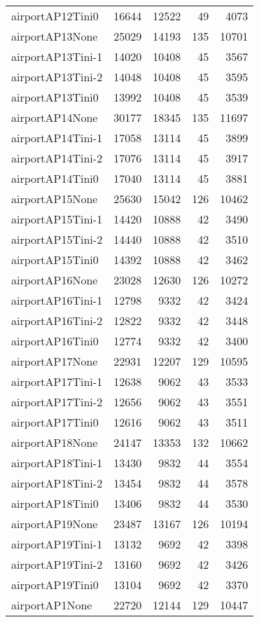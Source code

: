 \begin{longtable}{lrrrr}
airportAP12Tini0 & 16644 & 12522 & 49 & 4073 \\
airportAP13None & 25029 & 14193 & 135 & 10701 \\
airportAP13Tini-1 & 14020 & 10408 & 45 & 3567 \\
airportAP13Tini-2 & 14048 & 10408 & 45 & 3595 \\
airportAP13Tini0 & 13992 & 10408 & 45 & 3539 \\
airportAP14None & 30177 & 18345 & 135 & 11697 \\
airportAP14Tini-1 & 17058 & 13114 & 45 & 3899 \\
airportAP14Tini-2 & 17076 & 13114 & 45 & 3917 \\
airportAP14Tini0 & 17040 & 13114 & 45 & 3881 \\
airportAP15None & 25630 & 15042 & 126 & 10462 \\
airportAP15Tini-1 & 14420 & 10888 & 42 & 3490 \\
airportAP15Tini-2 & 14440 & 10888 & 42 & 3510 \\
airportAP15Tini0 & 14392 & 10888 & 42 & 3462 \\
airportAP16None & 23028 & 12630 & 126 & 10272 \\
airportAP16Tini-1 & 12798 & 9332 & 42 & 3424 \\
airportAP16Tini-2 & 12822 & 9332 & 42 & 3448 \\
airportAP16Tini0 & 12774 & 9332 & 42 & 3400 \\
airportAP17None & 22931 & 12207 & 129 & 10595 \\
airportAP17Tini-1 & 12638 & 9062 & 43 & 3533 \\
airportAP17Tini-2 & 12656 & 9062 & 43 & 3551 \\
airportAP17Tini0 & 12616 & 9062 & 43 & 3511 \\
airportAP18None & 24147 & 13353 & 132 & 10662 \\
airportAP18Tini-1 & 13430 & 9832 & 44 & 3554 \\
airportAP18Tini-2 & 13454 & 9832 & 44 & 3578 \\
airportAP18Tini0 & 13406 & 9832 & 44 & 3530 \\
airportAP19None & 23487 & 13167 & 126 & 10194 \\
airportAP19Tini-1 & 13132 & 9692 & 42 & 3398 \\
airportAP19Tini-2 & 13160 & 9692 & 42 & 3426 \\
airportAP19Tini0 & 13104 & 9692 & 42 & 3370 \\
airportAP1None & 22720 & 12144 & 129 & 10447 \\

\end{longtable}
